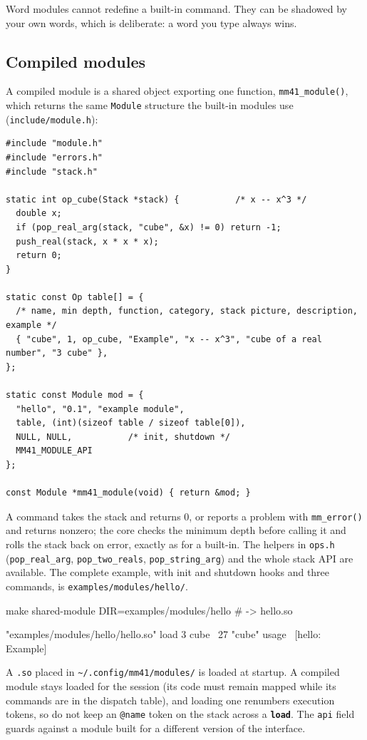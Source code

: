 \documentclass[11pt,letterpaper]{article}
\newcommand{\code}[1]{\texttt{#1}}
\newcommand{\cmd}[1]{\texttt{\textbf{#1}}}
\begin{document}
Word modules cannot redefine a built-in command. They can be shadowed by your own words, which is deliberate: a word you type always wins.

\subsection{Compiled modules}

A compiled module is a shared object exporting one function, \code{mm41\_module()}, which returns the same \code{Module} structure the built-in modules use (\code{include/module.h}):
\begin{Verbatim}[fontsize=\small,frame=single,rulecolor=\color{rule}]
#include "module.h"
#include "errors.h"
#include "stack.h"

static int op_cube(Stack *stack) {           /* x -- x^3 */
  double x;
  if (pop_real_arg(stack, "cube", &x) != 0) return -1;
  push_real(stack, x * x * x);
  return 0;
}

static const Op table[] = {
  /* name, min depth, function, category, stack picture, description, example */
  { "cube", 1, op_cube, "Example", "x -- x^3", "cube of a real number", "3 cube" },
};

static const Module mod = {
  "hello", "0.1", "example module",
  table, (int)(sizeof table / sizeof table[0]),
  NULL, NULL,           /* init, shutdown */
  MM41_MODULE_API
};

const Module *mm41_module(void) { return &mod; }
\end{Verbatim}
A command takes the stack and returns 0, or reports a problem with \code{mm\_error()} and returns nonzero; the core checks the minimum depth before calling it and rolls the stack back on error, exactly as for a built-in. The helpers in \code{ops.h} (\code{pop\_real\_arg}, \code{pop\_two\_reals}, \code{pop\_string\_arg}) and the whole stack API are available. The complete example, with init and shutdown hooks and three commands, is \code{examples/modules/hello/}.
\begin{shell}
make shared-module DIR=examples/modules/hello     # -> hello.so
\end{shell}
\begin{rpn}
"examples/modules/hello/hello.so" load
3 cube                     \ 27
"cube" usage               \ [hello: Example]
\end{rpn}
A \code{.so} placed in \code{\textasciitilde/.config/mm41/modules/} is loaded at startup. A compiled module stays loaded for the session (its code must remain mapped while its commands are in the dispatch table), and loading one renumbers execution tokens, so do not keep an \code{@name} token on the stack across a \cmd{load}. The \code{api} field guards against a module built for a different version of the interface.
\end{document}
